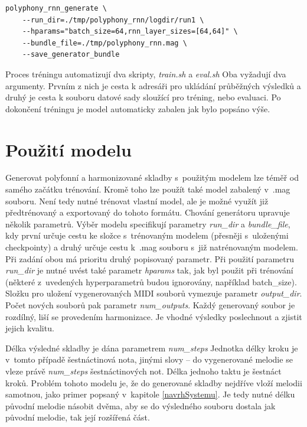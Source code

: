 \begin{verbatim}
polyphony_rnn_generate \
    --run_dir=./tmp/polyphony_rnn/logdir/run1 \
    --hparams="batch_size=64,rnn_layer_sizes=[64,64]" \
    --bundle_file=./tmp/polyphony_rnn.mag \
    --save_generator_bundle
\end{verbatim}

Proces tréningu automatizují dva skripty, \emph{train.sh} a \emph{eval.sh}
Oba vyžadují dva argumenty.
Prvním z nich je cesta k adresáři pro ukládání průběžných výsledků
a druhý je cesta k souboru datové sady sloužící pro tréning, nebo evaluaci.
Po dokončení tréningu je model automaticky zabalen jak bylo popsáno výše.

\section{Použití modelu}
Generovat polyfonní a harmonizované skladby s~použitým modelem
lze téměř od samého začátku trénování.
Kromě toho lze použít také model zabalený v~.mag souboru.
Není tedy nutné trénovat vlastní model, 
ale je možné využít již předtrénovaný a exportovaný do tohoto formátu.
Chování generátoru upravuje několik parametrů.
Výběr modelu specifikují parametry \emph{run\_dir} a \emph{bundle\_file},
kdy první určuje cestu ke složce s~trénovaným modelem (přesněji s~uloženými checkpointy)
a druhý určuje cestu k~.mag souboru s~již natrénovaným modelem.
Při zadání obou má prioritu druhý popisovaný parametr.
Při použití parametru \emph{run\_dir} je nutné uvést
také parametr \emph{hparams} tak, jak byl použit při trénování 
(některé z~uvedených hyperparametrů budou ignorovány, například batch\_size).
Složku pro uložení vygenerovaných MIDI souborů vymezuje parametr \emph{output\_dir}.
Počet nových souborů pak parametr \emph{num\_outputs}.
Každý generovaný soubor je rozdílný, liší se provedením harmonizace.
Je vhodné výsledky poslechnout a zjistit jejich kvalitu.
\par

Délka výsledné skladby je dána parametrem \emph{num\_steps} 
Jednotka délky kroku je v~tomto případě šestnáctinová nota,
jinými slovy -- do vygenerované melodie se vleze právě \emph{num\_steps} šestnáctinových not.
Délka jednoho taktu je šestnáct kroků.
Problém tohoto modelu je, že do generované skladby nejdříve vloží melodii samotnou, 
jako primer popsaný v~kapitole \ref{navrhSystemu}.
Je tedy nutné délku původní melodie násobit dvěma,
aby se do výsledného souboru dostala jak původní melodie,
tak její rozšířená část.
\cite{google_git_polyphony}
\par

